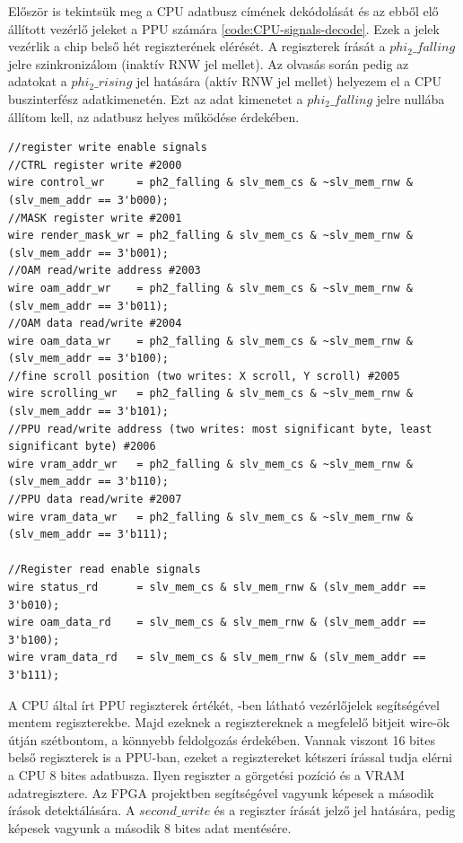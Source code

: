 	Először is tekintsük meg a CPU adatbusz címének dekódolását és az ebből elő állított vezérlő jeleket a PPU számára \ref{code:CPU-signals-decode}. Ezek a jelek vezérlik a chip belső hét regiszterének elérését. A regiszterek írását a $phi_2\_falling$ jelre szinkronizálom (inaktív RNW jel mellet). Az olvasás során pedig az adatokat a $phi_2\_rising$ jel hatására (aktív RNW jel mellet) helyezem el a CPU buszinterfész adatkimenetén. Ezt az adat kimenetet a $phi_2\_falling$ jelre nullába állítom kell, az adatbusz helyes működése érdekében.
	
\begin{lstlisting}[caption={A CPU adatbusz feldolgozása (PPU vezérlő jelek)}, label={code:CPU-signals-decode}, style=prettyverilog]
//register write enable signals
//CTRL register write #2000
wire control_wr     = ph2_falling & slv_mem_cs & ~slv_mem_rnw & (slv_mem_addr == 3'b000);
//MASK register write #2001 
wire render_mask_wr = ph2_falling & slv_mem_cs & ~slv_mem_rnw & (slv_mem_addr == 3'b001);
//OAM read/write address #2003 
wire oam_addr_wr    = ph2_falling & slv_mem_cs & ~slv_mem_rnw & (slv_mem_addr == 3'b011);
//OAM data read/write #2004 
wire oam_data_wr    = ph2_falling & slv_mem_cs & ~slv_mem_rnw & (slv_mem_addr == 3'b100);
//fine scroll position (two writes: X scroll, Y scroll) #2005
wire scrolling_wr   = ph2_falling & slv_mem_cs & ~slv_mem_rnw & (slv_mem_addr == 3'b101);
//PPU read/write address (two writes: most significant byte, least significant byte) #2006
wire vram_addr_wr   = ph2_falling & slv_mem_cs & ~slv_mem_rnw & (slv_mem_addr == 3'b110);
//PPU data read/write #2007 
wire vram_data_wr   = ph2_falling & slv_mem_cs & ~slv_mem_rnw & (slv_mem_addr == 3'b111);

//Register read enable signals
wire status_rd      = slv_mem_cs & slv_mem_rnw & (slv_mem_addr == 3'b010);
wire oam_data_rd    = slv_mem_cs & slv_mem_rnw & (slv_mem_addr == 3'b100);
wire vram_data_rd   = slv_mem_cs & slv_mem_rnw & (slv_mem_addr == 3'b111);\end{lstlisting}

	A CPU által írt PPU regiszterek értékét, -ben látható vezérlőjelek segítségével  mentem regiszterekbe. Majd ezeknek a regisztereknek a megfelelő bitjeit wire-ök útján szétbontom,  a könnyebb feldolgozás érdekében. Vannak viszont 16 bites belső regiszterek is a PPU-ban, ezeket a regisztereket kétszeri írással tudja elérni a CPU 8 bites adatbusza. Ilyen regiszter a görgetési pozíció és a VRAM adatregisztere. Az FPGA projektben  segítségével vagyunk képesek a második írások detektálására. A $second\_write$ és a regiszter írását jelző jel hatására, pedig képesek vagyunk a második 8 bites adat mentésére.

